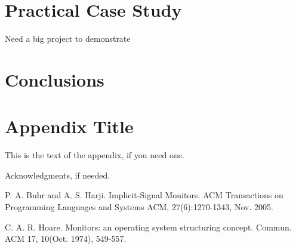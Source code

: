 \documentclass[preprint]{sigplanconf}
\begin{document}
\section{Practical Case Study} Need a big project to demonstrate 


\section{Conclusions} \label{sec:conclu}

\appendix
\section{Appendix Title}

This is the text of the appendix, if you need one.

\acks

Acknowledgments, if needed.





\begin{thebibliography}{}
    \softraggedright

    P. A. Buhr and A. S. Harji. Implicit-Signal Monitors. ACM Transactions on 
    Programming Languages and Systems ACM, 27(6):1270-1343, Nov. 2005.

     C. A. R. Hoare. Monitors: an operating system structuring concept. Commun. 
     ACM 17, 10(Oct. 1974), 549-557.

\end{thebibliography}
\end{document}
